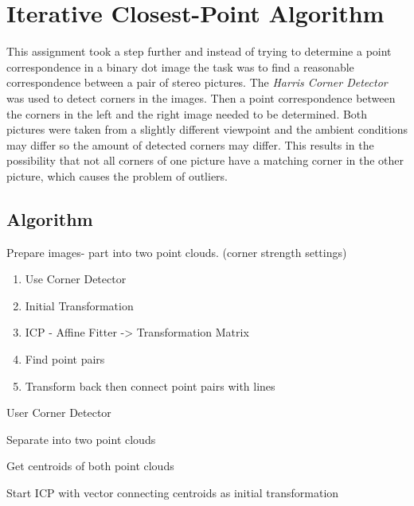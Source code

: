 \chapter{Iterative Closest-Point Algorithm}

This assignment took a step further and instead of trying to determine a point correspondence in a binary dot image the task was to find a reasonable correspondence between a pair of stereo pictures.
The \textit{Harris Corner Detector}\cite{Harris2020} was used to detect corners in the images. Then a point correspondence between the corners in the left and the right image needed to be determined. Both pictures were taken from a slightly different viewpoint and the ambient conditions may differ so the amount of detected corners may differ. This results in the possibility that not all corners of one picture have a matching corner in the other picture, which causes the problem of outliers. 


\section{Algorithm}

Prepare images- part into two point clouds. (corner strength settings)

\begin{enumerate}
	\item Use Corner Detector
	\item Initial Transformation
	\item ICP - Affine Fitter -> Transformation Matrix
	\item Find point pairs
	\item Transform back then connect point pairs with lines
\end{enumerate}

\begin{algorithm}
User Corner Detector

Separate into two point clouds

Get centroids of both point clouds

Start ICP with vector connecting centroids as initial transformation



\end{algorithm}
